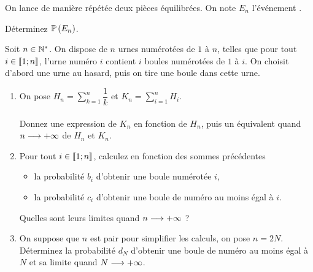 \begin{exos}
On lance de manière répétée deux pièces équilibrées. On note \(E_n\) l'événement .

Déterminez \(\mathbb{P}\left(E_n\right)\).
\end{exos}

\begin{exoss}
Soit \(n\in\mathbb{N}^*\). On dispose de \(n\) urnes numérotées de \(1\) à \(n\), telles que pour tout \(i\in\left\llbracket1;n\right\rrbracket\), l'urne numéro \(i\) contient \(i\) boules numérotées de \(1\) à \(i\). On choisit d'abord une urne au hasard, puis on tire une boule dans cette urne.

\begin{enumerate}
    \item On pose \(H_n=\sum_{k=1}^n\dfrac{1}{k}\) et \(K_n=\sum_{i=1}^nH_i\). \\\\ Donnez une expression de \(K_n\) en fonction de \(H_n\), puis un équivalent quand \(n\longrightarrow+\infty\) de \(H_n\) et \(K_n\). \\
    \item Pour tout \(i\in\left\llbracket1;n\right\rrbracket\), calculez en fonction des sommes précédentes \begin{itemize}
        \item la probabilité \(b_i\) d'obtenir une boule numérotée \(i\),
        \item la probabilité \(c_i\) d'obtenir une boule de numéro au moins égal à \(i\). \\
    \end{itemize} Quelles sont leurs limites quand \(n\longrightarrow+\infty\) ? \\
    \item On suppose que \(n\) est pair pour simplifier les calculs, on pose \(n=2N\). Déterminez la probabilité \(d_N\) d'obtenir une boule de numéro au moins égal à \(N\) et sa limite quand \(N\longrightarrow+\infty\).
\end{enumerate}
\end{exoss}

